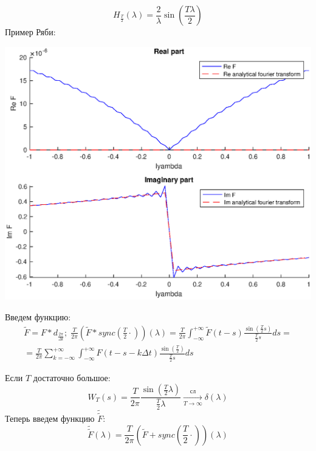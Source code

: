 \[H_{\frac{T}{2}}(\lambda) = \frac{2}{\lambda}\sin(\frac{T\lambda}{2})\]
Пример Ряби:
\begin{center}
        \includegraphics[width=1\textwidth]{ch5/pic_1_2.eps}
\end{center}
Введем функцию:
\begin{multline}
\widetilde{F} = F*d_{\frac{2\pi}{\Delta t}};\;\frac{T}{2\pi}(\widetilde{F}*sync(\frac{T}{2}\cdot))(\lambda) = \frac{T}{2\pi}\int_{-\infty}^{+\infty} \widetilde{F}(t - s)\frac{\sin(\frac{T}{2}s)}{\frac{T}{2}s}ds =\\
= \frac{T}{2\pi} \sum_{k = -\infty}^{+\infty} \int_{-\infty}^{+\infty} F(t - s - k\Delta t)\frac{\sin(\frac{T}{2})}{\frac{T}{2}s}ds
\end{multline}

Если $T$ достаточно большое: \[W_T(s) = \frac{T}{2\pi}\frac{\sin(\frac{T}{2}\lambda)}{\frac{T}{2}\lambda} \xrightarrow[T\to\infty] {\texttt{сл}} \delta(\lambda)\]
Теперь введем функцию $\widetilde{\widetilde{F}}:$
\[\widetilde{\widetilde{F}}(\lambda) = \frac{T}{2\pi}(\widetilde{F} + sync(\frac{T}{2}\cdot))(\lambda)\]

